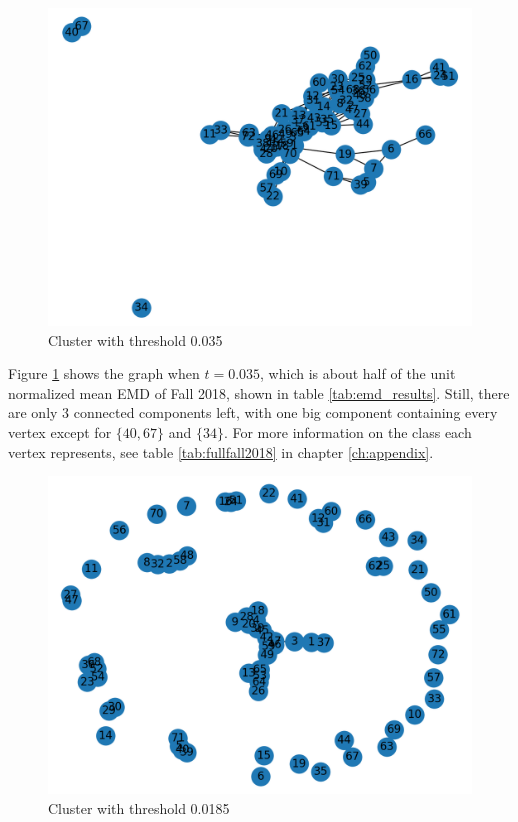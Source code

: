 \documentclass[12pt,letterpaper,oneside,openany]{book}
\begin{document}
\begin{figure}
	\centering
	\includegraphics[width=\textwidth]{./images/n2018_th_0p035.png}
	\caption{Cluster with threshold 0.035}
	\label{fig:cluster18t035}
\end{figure}

Figure \ref{fig:cluster18t035} shows the graph when $t=0.035$, which is about half of the unit normalized mean EMD of Fall 2018, shown in table \ref{tab:emd_results}. Still, there are only 3 connected components left, with one big component containing every vertex except for $\{40, 67\}$ and $\{34\}$. For more information on the class each vertex represents, see table \ref{tab:fullfall2018} in chapter \ref{ch:appendix}.

\begin{figure}
	\centering
	\includegraphics[width=\textwidth]{./images/n2018_th_0p0185.png}
	\caption{Cluster with threshold 0.0185}
	\label{fig:cluster18t0185}
\end{figure}
\end{document}
